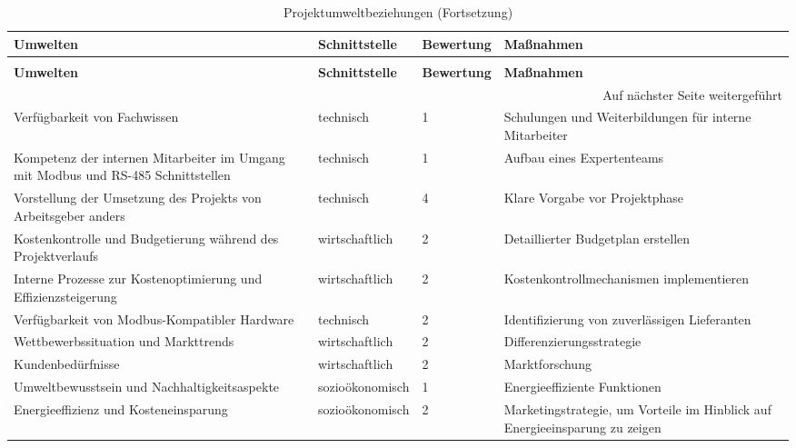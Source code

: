 \begin{longtable}{p{} | p{} | p{} | p{}}
	\caption{Projektumweltbeziehungen}
	\label{tab:umweltbeziehungen}
	\\ \toprule
	\textbf{Umwelten} & \textbf{Schnittstelle} & \textbf{Bewertung} & \textbf{Maßnahmen}
	\\ \midrule
	\endfirsthead
	\caption{Projektumweltbeziehungen (Fortsetzung)}
	\\ \toprule
	\textbf{Umwelten} & \textbf{Schnittstelle} & \textbf{Bewertung} & \textbf{Maßnahmen}
	\\ \midrule
	\endhead
	\midrule
	\multicolumn{4}{r}{{Auf nächster Seite weitergeführt}} 
	\\ \bottomrule
	\endfoot
	\bottomrule
	\endlastfoot
	Verfügbarkeit von Fachwissen & technisch & 1 & Schulungen und Weiterbildungen für interne Mitarbeiter \\
	\midrule
	Kompetenz der internen Mitarbeiter im Umgang mit Modbus und RS-485 Schnittstellen & technisch & 1 & Aufbau eines Expertenteams \\
	\midrule
	Vorstellung der Umsetzung des Projekts von Arbeitsgeber anders & technisch & 4 & Klare Vorgabe vor Projektphase \\
	\midrule
	Kostenkontrolle und Budgetierung während des Projektverlaufs & wirtschaftlich & 2 & Detaillierter Budgetplan erstellen \\
	Interne Prozesse zur Kostenoptimierung und Effizienzsteigerung & wirtschaftlich & 2 & Kostenkontrollmechanismen implementieren \\
	\midrule
	Verfügbarkeit von Modbus-Kompatibler Hardware & technisch & 2 & Identifizierung von zuverlässigen Lieferanten \\
	\midrule
	Wettbewerbssituation und Markttrends & wirtschaftlich & 2 & Differenzierungsstrategie \\
	\midrule
	Kundenbedürfnisse & wirtschaftlich & 2 & Marktforschung \\
	\midrule
	Umweltbewusstsein und Nachhaltigkeitsaspekte & sozioökonomisch & 1 & Energieeffiziente Funktionen \\
	\midrule
	Energieeffizienz und Kosteneinsparung & sozioökonomisch & 2 & Marketingstrategie, um Vorteile im Hinblick auf Energieeinsparung zu zeigen \\
\end{longtable}
